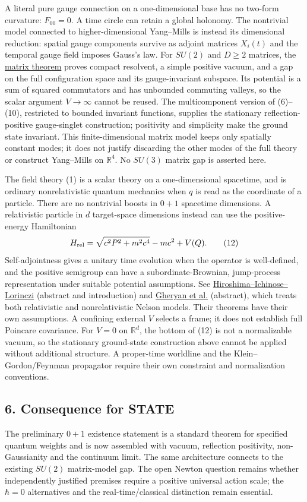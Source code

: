 \documentclass[11pt,a4paper]{article}
\begin{document}
A literal pure gauge connection on a one-dimensional base has no
two-form curvature: \(F_{00}=0\). A time circle can retain a global
holonomy. The nontrivial model connected to higher-dimensional
Yang--Mills is instead its dimensional reduction: spatial gauge
components survive as adjoint matrices \(X_i(t)\) and the temporal gauge
field imposes Gauss's law. For \(SU(2)\) and \(D\ge2\) matrices, the
\href{low-dimensional-mass-gap.md\#32-the-su2-matrix-model-and-its-abelian-valleys}{matrix
theorem} proves compact resolvent, a simple positive vacuum, and a gap
on the full configuration space and its gauge-invariant subspace. Its
potential is a sum of squared commutators and has unbounded commuting
valleys, so the scalar argument \(V\to\infty\) cannot be reused. The
multicomponent version of (6)--(10), restricted to bounded invariant
functions, supplies the stationary reflection-positive gauge-singlet
construction; positivity and simplicity make the ground state invariant.
This finite-dimensional matrix model keeps only spatially constant
modes; it does not justify discarding the other modes of the full theory
or construct Yang--Mills on \(\mathbb R^4\). No \(SU(3)\) matrix gap is
asserted here.

The field theory (1) is a scalar theory on a one-dimensional spacetime,
and is ordinary nonrelativistic quantum mechanics when \(q\) is read as
the coordinate of a particle. There are no nontrivial boosts in \(0+1\)
spacetime dimensions. A relativistic particle in \(d\) target-space
dimensions instead can use the positive-energy Hamiltonian
\[H_{\rm rel}=\sqrt{c^2P^2+m^2c^4}-mc^2+V(Q).\tag{12}\] Self-adjointness
gives a unitary time evolution when the operator is well-defined, and
the positive semigroup can have a subordinate-Brownian, jump-process
representation under suitable potential assumptions. See
\href{https://arxiv.org/abs/1109.5829}{Hiroshima--Ichinose--Lorinczi}
(abstract and introduction) and
\href{https://arxiv.org/abs/1605.01791}{Gheryan et al.} (abstract),
which treats both relativistic and nonrelativistic Nelson models. Their
theorems have their own assumptions. A confining external \(V\) selects
a frame; it does not establish full Poincare covariance. For \(V=0\) on
\(\mathbb R^d\), the bottom of (12) is not a normalizable vacuum, so the
stationary ground-state construction above cannot be applied without
additional structure. A proper-time worldline and the
Klein--Gordon/Feynman propagator require their own constraint and
normalization conventions.

\hypertarget{consequence-for-state}{%
\subsection{6. Consequence for STATE}\label{consequence-for-state}}

The preliminary \(0+1\) existence statement is a standard theorem for
specified quantum weights and is now assembled with vacuum, reflection
positivity, non-Gaussianity and the continuum limit. The same
architecture connects to the existing \(SU(2)\) matrix-model gap. The
open Newton question remains whether independently justified premises
require a positive universal action scale; the \(\hbar=0\) alternatives
and the real-time/classical distinction remain essential.
\end{document}
